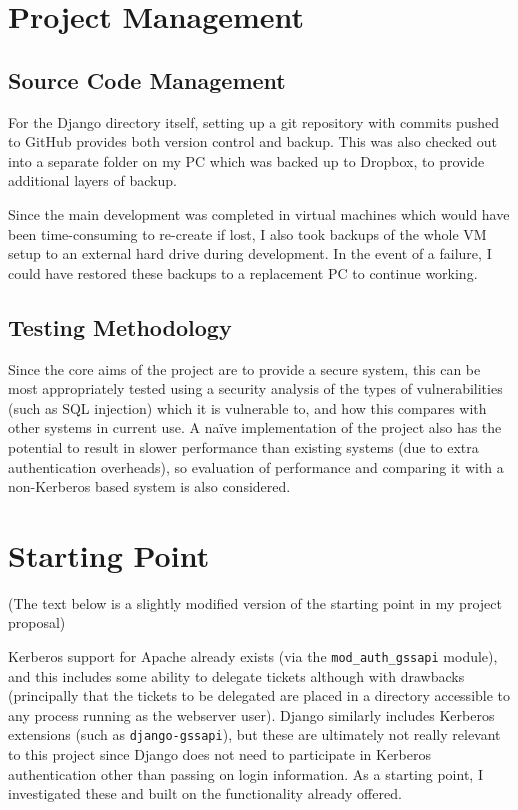 \documentclass[12pt]{report}
\begin{document}
\section{Project Management}
\subsection{Source Code Management}
For the Django directory itself, setting up a git repository with commits pushed to GitHub provides both version control and backup. This was also checked out into a separate folder on my PC which was backed up to Dropbox, to provide additional layers of backup.

Since the main development was completed in virtual machines which would have been time-consuming to re-create if lost, I also took backups of the whole VM setup to an external hard drive during development. In the event of a failure, I could have restored these backups to a replacement PC to continue working.

\subsection{Testing Methodology}
Since the core aims of the project are to provide a secure system, this can be most appropriately tested using a security analysis of the types of vulnerabilities (such as SQL injection) which it is vulnerable to, and how this compares with other systems in current use. A na\"ive implementation of the project also has the potential to result in slower performance than existing systems (due to extra authentication overheads), so evaluation of performance and comparing it with a non-Kerberos based system is also considered.

\section{Starting Point}
\label{sec:starting_point}
(The text below is a slightly modified version of the starting point in my project proposal)

Kerberos support for Apache already exists (via the \verb+mod_auth_gssapi+ module), and this includes some ability to delegate tickets although with drawbacks (principally that the tickets to be delegated are placed in a directory accessible to any process running as the webserver user). Django similarly includes Kerberos extensions (such as \verb+django-gssapi+), but these are ultimately not really relevant to this project since Django does not need to participate in Kerberos authentication other than passing on login information. As a starting point, I investigated these and built on the functionality already offered.
\end{document}
